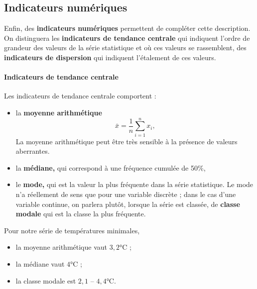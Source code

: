\subsection{Indicateurs numériques}
Enfin, des \textbf{indicateurs numériques} permettent de compléter cette
description. On distinguera les \textbf{indicateurs de tendance centrale} qui
indiquent l'ordre de grandeur des valeurs de la série statistique et où ces
valeurs se rassemblent, des \textbf{indicateurs de dispersion} qui indiquent
l'étalement de ces valeurs.

\paragraph{Indicateurs de tendance centrale} Les indicateurs de tendance centrale comportent :
\begin{itemize}
\item la \textbf{moyenne arithmétique} 
\[\bar x = \frac1n \sum_{i=1}^n x_i,\]
La  moyenne arithmétique peut être très sensible à la présence de valeurs aberrantes.
\item la \textbf{médiane,} qui correspond à une fréquence cumulée de 50\%, 
\item le \textbf{mode,} qui est la valeur la plus fréquente dans la série
  statistique. Le mode n'a réellement de sens que pour une variable discrète ;
  dans le cas d'une variable continue, on parlera plutôt, lorsque la série est
  classée, de \textbf{classe modale} qui est la classe la plus fréquente.
\end{itemize}

\begin{exemple}
  Pour notre série de températures minimales,
  \begin{itemize}
  \item la moyenne arithmétique vaut $3,2 \si{\celsius}$ ;
  \item la médiane vaut $4 \si{\celsius}$ ;
  \item la classe modale est $2,1$ -- $4,4 \si{\celsius}$.
  \end{itemize}
\end{exemple}

